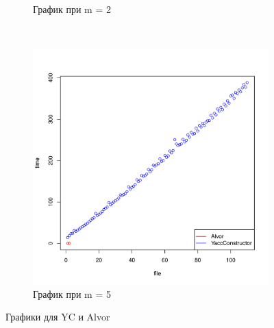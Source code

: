 \documentclass{matmex-diploma}
\begin{document}
\begin{figure}
\begin{subfigure}[b]{0.3\textwidth}
                \caption{График при m = 2}
                \label{fig:m=2_YC_Alvor}
        \end{subfigure}
        ~ %
        \begin{subfigure}[b]{0.3\textwidth}
                \includegraphics[width=\textwidth]{m=5_YC_Alvor}
                \caption{График при m = 5}
                \label{fig:m=5_breakYC_Alvor}
        \end{subfigure}
        \caption{Графики для YC и Alvor}\label{fig:graph_yc_alvor}
\end{figure}
\end{document}
